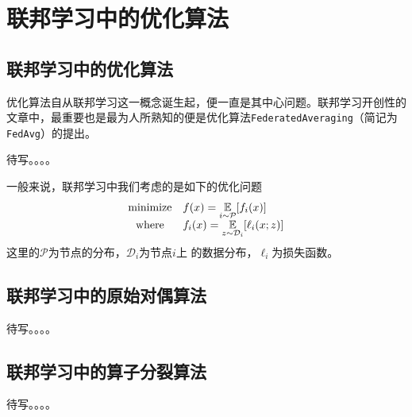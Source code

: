 \chapter{\hspace{-1mm}\bf 联邦学习中的优化算法}
\label{chap2}


\section{联邦学习中的优化算法}

优化算法自从联邦学习这一概念诞生起，便一直是其中心问题。联邦学习开创性的文章\cite{mcmahan2017fed_avg}中，最重要也是最为人所熟知的便是优化算法\texttt{FederatedAveraging}（简记为\texttt{FedAvg}）的提出。

待写。。。。

一般来说，联邦学习中我们考虑的是如下的优化问题
\begin{equation}
\label{eq:fl-basic}
\begin{array}{cl}
\text{minimize} & f(x) = \operatorname*{\mathbb{E}}\limits_{i \sim {\mathcal{P}}} [f_i(x)] \\
\text{where} & f_i(x) = \operatorname*{\mathbb{E}}\limits_{z \sim \mathcal{D}_i} [\ell_i(x; z)]
\end{array}
\end{equation}
这里的$\mathcal{P}$为节点的分布，$\mathcal{D}_i$为节点$i$上 的数据分布，$\ell_i$为损失函数。

\section{联邦学习中的原始对偶算法}

待写。。。。

\section{联邦学习中的算子分裂算法}

待写。。。。
